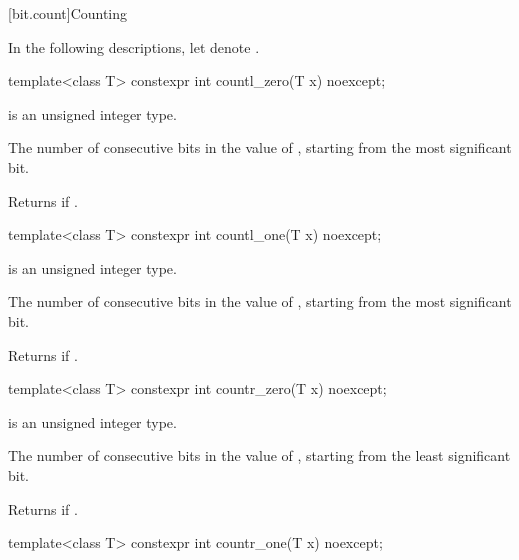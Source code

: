 [bit.count]{Counting}

\pnum
In the following descriptions,
let  denote .

\begin{itemdecl}
template<class T>
  constexpr int countl_zero(T x) noexcept;
\end{itemdecl}

%
\begin{itemdescr}
\pnum
\constraints
{} is an unsigned integer type.

\pnum
\returns
The number of consecutive  bits in the value of ,
starting from the most significant bit.
\begin{note}
Returns  if .
\end{note}
\end{itemdescr}

\begin{itemdecl}
template<class T>
  constexpr int countl_one(T x) noexcept;
\end{itemdecl}

%
\begin{itemdescr}
\pnum
\constraints
{} is an unsigned integer type.

\pnum
\returns
The number of consecutive  bits in the value of ,
starting from the most significant bit.
\begin{note}
Returns  if .
\end{note}
\end{itemdescr}

\begin{itemdecl}
template<class T>
  constexpr int countr_zero(T x) noexcept;
\end{itemdecl}

%
\begin{itemdescr}
\pnum
\constraints
{} is an unsigned integer type.

\pnum
\returns
The number of consecutive  bits in the value of ,
starting from the least significant bit.
\begin{note}
Returns  if .
\end{note}
\end{itemdescr}

\begin{itemdecl}
template<class T>
  constexpr int countr_one(T x) noexcept;
\end{itemdecl}

